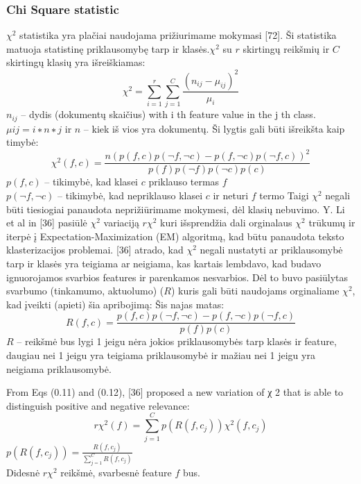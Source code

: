 \documentclass{VUMIFInfKursinis}
\begin{document}
\subsubsection{Chi Square statistic}
 $\chi^2$ statistika yra plačiai naudojama prižiurimame mokymasi [72]. Ši statistika matuoja statistinę priklausomybę tarp  ir klasės.$\chi^2$ su $r$ skirtingų reikšmių ir $C$ skirtingų klasių yra išreiškiamas:
\begin{equation}
	\chi^2=\sum _{i=1}^{r}{\sum _{j=1}^{C}{\frac {{(n_{ij}-\mu_{ij})}^{2}}{\mu_{i}}}}
\end{equation} 
$n_{ij}$ –  dydis (dokumentų skaičius) with i th feature value in the j th class.\\
$μ ij = i∗ n ∗j$ ir $n$ – kiek iš vios yra dokumentų.
Ši lygtis gali būti išreikšta kaip timybė:
\begin{equation}
	\chi^2(f,c)=\frac{n{(p(f,c)p(\neg f, \neg c) - p(f,\neg c)p(\neg f, c))}^2}{p(f)p(\neg f)p(\neg c)p(c)}
\end{equation} 
$p(f,c)$ – tikimybė, kad klasei $c$ priklauso termas $f$\\
$p(\neg f,\neg c)$ – tikimybė, kad nepriklauso klasei $c$ ir neturi $f$ termo 
Taigi $\chi^2$ negali būti tiesiogiai panaudota neprižiūrimame mokymesi, dėl klasių nebuvimo. 
Y. Li et al in [36] pasiūlė $\chi^2$ variaciją $r\chi^2$ kuri išsprendžia dali orginalaus $\chi^2$ trūkumų ir iterpė į Expectation-Maximization (EM) algoritmą, kad būtu panaudota teksto klasterizacijos problemai. [36] atrado, kad $\chi^2$ negali nustatyti ar priklausomybė tarp  ir klasės yra teigiama ar neigiama, kas kartais lembdavo, kad budavo ignuorojamos svarbios features ir parenkamos nesvarbios. Dėl to buvo pasiūlytas svarbumo (tinkamumo, aktuolumo)  ($R$) kuris gali būti naudojams orginaliame $\chi^2$, kad įveikti (apieti) šia apribojimą: Šis najas matas: 
\begin{equation}
	R(f,c)=\frac{p(f,c)p(\neg f, \neg c) - p(f,\neg c)p(\neg f, c)}{p(f)p(c)} \end{equation} 
$R$ – reikšmė bus lygi 1 jeigu nėra jokios priklausomybės tarp klasės ir feature, daugiau nei 1 jeigu yra teigiama priklausomybė ir mažiau nei 1 jeigu yra neigiama priklausomybė.

From Eqs (0.11) and (0.12), [36] proposed a new variation of χ 2 that is able to distinguish positive and negative relevance: 
\begin{equation}
	r\chi^2(f)=\sum^{C}_{j=1}{p(R(f,c_j))\chi^2(f,c_j)}
\end{equation} 
$p(R(f,c_j))=\frac{R(f,c_j)}{\sum^{C}_{j=1}{R(f,c_j)}}$\\
Didesnė $r\chi^2$ reikšmė, svarbesnė feature $f$ bus.
\end{document}

